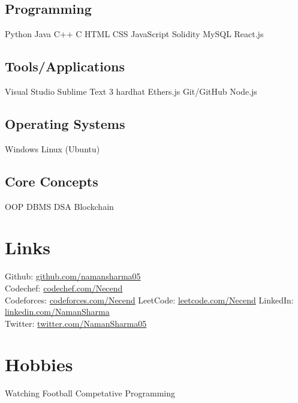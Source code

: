 \documentclass[letterpaper]{deedy-resume} %
\begin{document}
\begin{minipage}[t]{0.35\textwidth}
\subsection{Programming}
\subsubsectionspace
\textbullet{}Python \textbullet{} Java \textbullet{} C++ \textbullet{} C \textbullet{} HTML \textbullet{}CSS \textbullet{}JavaScript \textbullet{} Solidity \textbullet{} MySQL
\textbullet{}React.js
\subsectionspace

\subsection{Tools/Applications}
\subsubsectionspace
\textbullet{}Visual Studio \textbullet{} Sublime Text 3
\textbullet{} hardhat \textbullet{} Ethers.js \textbullet{} Git/GitHub \textbullet{} Node.js

\subsectionspace
\subsection{Operating Systems}
\subsubsectionspace
\textbullet{}Windows \textbullet{} Linux (Ubuntu)
\subsectionspace
\subsection{Core Concepts}
\subsubsectionspace
\textbullet{} OOP
\textbullet{} DBMS
\textbullet{} DSA
\textbullet{} Blockchain
\sectionspace
\section{Links} 
\subsubsectionspace
Github: \href{https://github.com/namansharma05}{github.com/namansharma05} \\
Codechef: \href{https://www.codechef.com/users/necend}{codechef.com/Necend} \\
Codeforces: \href{https://codeforces.com/profile/Necend}{codeforces.com/Necend}
LeetCode: \href{https://leetcode.com/Necend/}{leetcode.com/Necend}
LinkedIn: \href{https://linkedin.com/in/naman-kumar-sharma-5575a4184/}{linkedin.com/NamanSharma} \\
Twitter: \href{https://twitter.com/NamanSharma05}{twitter.com/NamanSharma05}


\sectionspace %

\section{Hobbies}
\subsubsectionspace
\textbullet{}Watching Football \textbullet{} Competative Programming

\end{minipage} %
\end{document}
